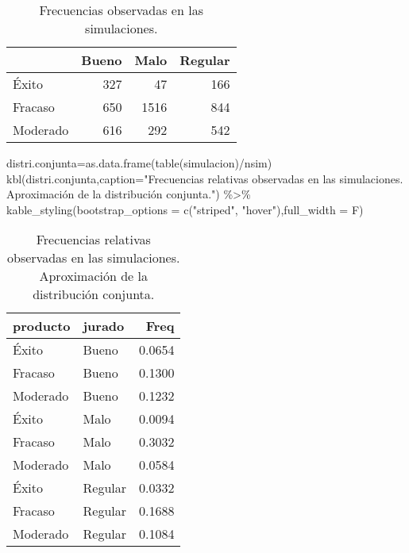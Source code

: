 \documentclass[
]{book}
\newenvironment{Shaded}{\begin{snugshade}}{\end{snugshade}}
\newcommand{\AttributeTok}[1]{\textcolor[rgb]{0.77,0.63,0.00}{#1}}
\newcommand{\FunctionTok}[1]{\textcolor[rgb]{0.00,0.00,0.00}{#1}}
\newcommand{\NormalTok}[1]{#1}
\newcommand{\OtherTok}[1]{\textcolor[rgb]{0.56,0.35,0.01}{#1}}
\newcommand{\SpecialCharTok}[1]{\textcolor[rgb]{0.00,0.00,0.00}{#1}}
\newcommand{\StringTok}[1]{\textcolor[rgb]{0.31,0.60,0.02}{#1}}
\theoremstyle{definition}
\theoremstyle{definition}
\theoremstyle{definition}
\theoremstyle{definition}
\theoremstyle{remark}
\begin{document}
\begin{table}

\caption{\label{tab:01-030a}Frecuencias observadas en las simulaciones.}
\centering
\begin{tabular}[t]{l|r|r|r}
\hline
  & Bueno & Malo & Regular\\
\hline
Éxito & 327 & 47 & 166\\
\hline
Fracaso & 650 & 1516 & 844\\
\hline
Moderado & 616 & 292 & 542\\
\hline
\end{tabular}
\end{table}

\begin{Shaded}
\begin{Highlighting}[]
\NormalTok{distri.conjunta}\OtherTok{=}\FunctionTok{as.data.frame}\NormalTok{(}\FunctionTok{table}\NormalTok{(simulacion)}\SpecialCharTok{/}\NormalTok{nsim)}
\FunctionTok{kbl}\NormalTok{(distri.conjunta,}\AttributeTok{caption=}\StringTok{"Frecuencias relativas observadas en las simulaciones. Aproximación de la distribución conjunta."}\NormalTok{) }\SpecialCharTok{\%\textgreater{}\%}
    \FunctionTok{kable\_styling}\NormalTok{(}\AttributeTok{bootstrap\_options =} \FunctionTok{c}\NormalTok{(}\StringTok{"striped"}\NormalTok{, }\StringTok{"hover"}\NormalTok{),}\AttributeTok{full\_width =}\NormalTok{ F)}
\end{Highlighting}
\end{Shaded}

\begin{table}

\caption{\label{tab:01-030b}Frecuencias relativas observadas en las simulaciones. Aproximación de la distribución conjunta.}
\centering
\begin{tabular}[t]{l|l|r}
\hline
producto & jurado & Freq\\
\hline
Éxito & Bueno & 0.0654\\
\hline
Fracaso & Bueno & 0.1300\\
\hline
Moderado & Bueno & 0.1232\\
\hline
Éxito & Malo & 0.0094\\
\hline
Fracaso & Malo & 0.3032\\
\hline
Moderado & Malo & 0.0584\\
\hline
Éxito & Regular & 0.0332\\
\hline
Fracaso & Regular & 0.1688\\
\hline
Moderado & Regular & 0.1084\\
\hline
\end{tabular}
\end{table}
\end{document}
